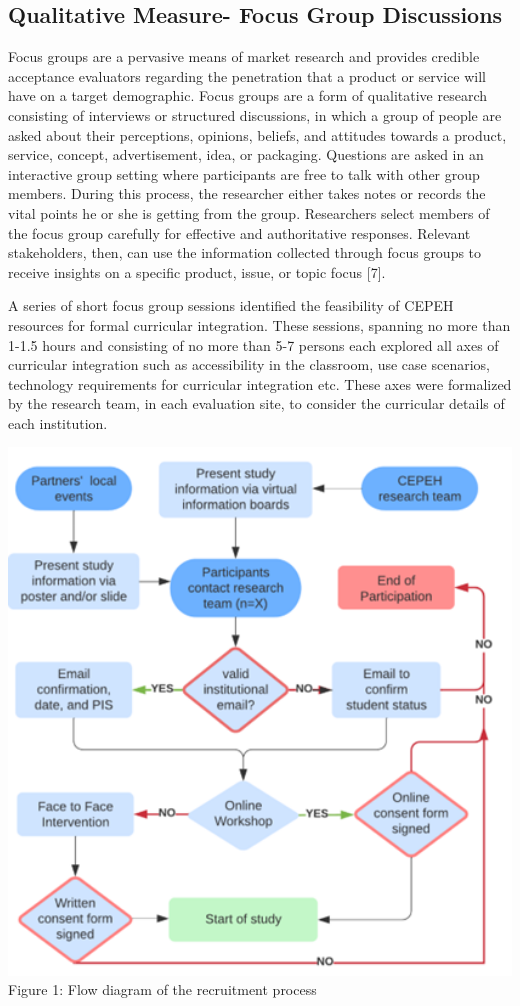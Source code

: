 \documentclass[a4paper, nobind]{templates/ociamthesis}
\begin{document}
\hypertarget{qualitative-measure--focus-group-discussions}{%
\subsection{Qualitative Measure- Focus Group Discussions}\label{qualitative-measure--focus-group-discussions}}

Focus groups are a pervasive means of market research and provides credible acceptance evaluators regarding the penetration that a product or service will have on a target demographic.
Focus groups are a form of qualitative research consisting of interviews or structured discussions, in which a group of people are asked about their perceptions, opinions, beliefs, and attitudes towards a product, service, concept, advertisement, idea, or packaging.
Questions are asked in an interactive group setting where participants are free to talk with other group members.
During this process, the researcher either takes notes or records the vital points he or she is getting from the group.
Researchers select members of the focus group carefully for effective and authoritative responses.
Relevant stakeholders, then, can use the information collected through focus groups to receive insights on a specific product, issue, or topic focus {[}7{]}.

A series of short focus group sessions identified the feasibility of CEPEH resources for formal curricular integration.
These sessions, spanning no more than 1-1.5 hours and consisting of no more than 5-7 persons each explored all axes of curricular integration such as accessibility in the classroom, use case scenarios, technology requirements for curricular integration etc.
These axes were formalized by the research team, in each evaluation site, to consider the curricular details of each institution.

\includegraphics[width=5.76in]{untitled-1}
Figure 1: Flow diagram of the recruitment process
\end{document}
